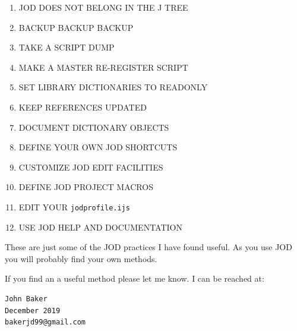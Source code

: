 \documentclass[11pt,letter,landscape]{article}
\begin{document}
\begin{enumerate}
\def\labelenumi{\arabic{enumi}.}
\item
  JOD DOES NOT BELONG IN THE J TREE
\item
  BACKUP BACKUP BACKUP
\item
  TAKE A SCRIPT DUMP
\item
  MAKE A MASTER RE-REGISTER SCRIPT
\item
  SET LIBRARY DICTIONARIES TO READONLY
\item
  KEEP REFERENCES UPDATED
\item
  DOCUMENT DICTIONARY OBJECTS
\item
  DEFINE YOUR OWN JOD SHORTCUTS
\item
  CUSTOMIZE JOD EDIT FACILITIES
\item
  DEFINE JOD PROJECT MACROS
\item
  EDIT YOUR \texttt{jodprofile.ijs}
\item
  USE JOD HELP AND DOCUMENTATION
\end{enumerate}

These are just some of the JOD practices I have found useful. As you use
JOD you will probably find your own methods.

If you find an a useful method please let me know. I can be reached at:

\begin{verbatim}
John Baker 
December 2019
bakerjd99@gmail.com
\end{verbatim}


    
    
    
    
\end{document}
